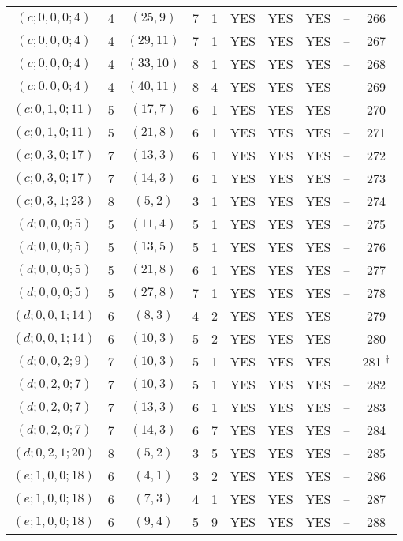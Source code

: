 \begin{longtable}{|c|c|c|c|c|c|c|c|c|c|}
$(c; 0, 0, 0; 4)$ & 4 & $(25, 9)$ & 7 & 1 & YES & YES & YES & -- & 266\\
$(c; 0, 0, 0; 4)$ & 4 & $(29, 11)$ & 7 & 1 & YES & YES & YES & -- & 267\\
$(c; 0, 0, 0; 4)$ & 4 & $(33, 10)$ & 8 & 1 & YES & YES & YES & -- & 268\\
$(c; 0, 0, 0; 4)$ & 4 & $(40, 11)$ & 8 & 4 & YES & YES & YES & -- & 269\\
$(c; 0, 1, 0; 11)$ & 5 & $(17, 7)$ & 6 & 1 & YES & YES & YES & -- & 270\\
$(c; 0, 1, 0; 11)$ & 5 & $(21, 8)$ & 6 & 1 & YES & YES & YES & -- & 271\\
$(c; 0, 3, 0; 17)$ & 7 & $(13, 3)$ & 6 & 1 & YES & YES & YES & -- & 272\\
$(c; 0, 3, 0; 17)$ & 7 & $(14, 3)$ & 6 & 1 & YES & YES & YES & -- & 273\\
$(c; 0, 3, 1; 23)$ & 8 & $(5, 2)$ & 3 & 1 & YES & YES & YES & -- & 274\\
$(d; 0, 0, 0; 5)$ & 5 & $(11, 4)$ & 5 & 1 & YES & YES & YES & -- & 275\\
$(d; 0, 0, 0; 5)$ & 5 & $(13, 5)$ & 5 & 1 & YES & YES & YES & -- & 276\\
$(d; 0, 0, 0; 5)$ & 5 & $(21, 8)$ & 6 & 1 & YES & YES & YES & -- & 277\\
$(d; 0, 0, 0; 5)$ & 5 & $(27, 8)$ & 7 & 1 & YES & YES & YES & -- & 278\\
$(d; 0, 0, 1; 14)$ & 6 & $(8, 3)$ & 4 & 2 & YES & YES & YES & -- & 279\\
$(d; 0, 0, 1; 14)$ & 6 & $(10, 3)$ & 5 & 2 & YES & YES & YES & -- & 280\\
$(d; 0, 0, 2; 9)$ & 7 & $(10, 3)$ & 5 & 1 & YES & YES & YES & -- & 281 ${}^\dagger$\\
$(d; 0, 2, 0; 7)$ & 7 & $(10, 3)$ & 5 & 1 & YES & YES & YES & -- & 282\\
$(d; 0, 2, 0; 7)$ & 7 & $(13, 3)$ & 6 & 1 & YES & YES & YES & -- & 283\\
$(d; 0, 2, 0; 7)$ & 7 & $(14, 3)$ & 6 & 7 & YES & YES & YES & -- & 284\\
$(d; 0, 2, 1; 20)$ & 8 & $(5, 2)$ & 3 & 5 & YES & YES & YES & -- & 285\\
$(e; 1, 0, 0; 18)$ & 6 & $(4, 1)$ & 3 & 2 & YES & YES & YES & -- & 286\\
$(e; 1, 0, 0; 18)$ & 6 & $(7, 3)$ & 4 & 1 & YES & YES & YES & -- & 287\\
$(e; 1, 0, 0; 18)$ & 6 & $(9, 4)$ & 5 & 9 & YES & YES & YES & -- & 288\\

\end{longtable}
